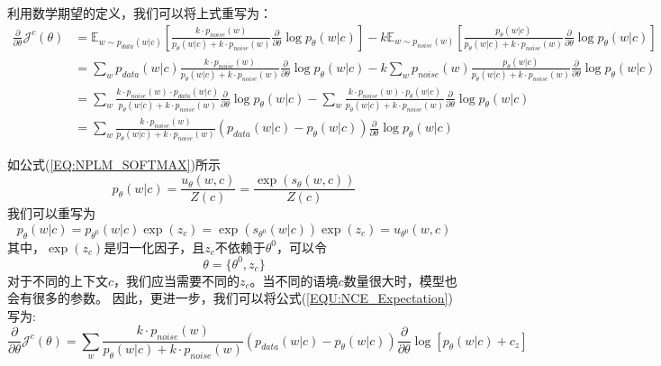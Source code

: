 \documentclass{article}
\begin{document}
利用数学期望的定义，我们可以将上式重写为：
\begin{equation}
    \begin{split}
        \frac{\partial}{\partial \theta} \mathcal{J}^c (\theta) &= \mathbb{E}_{w \sim p_{data}(w|c)} \left[ \frac{k \cdot p_{noise}(w)}{p_\theta(w|c) + k \cdot p_{noise}(w)}  \frac{\partial}{\partial \theta} \log p_\theta(w|c) \right] -  k  \mathbb{E}_{w \sim p_{noise}(w)} \left[ \frac{p_\theta(w|c)}{p_\theta (w|c) + k \cdot p_{noise}(w)} \frac{\partial}{\partial \theta} \log p_\theta(w|c) \right] \\
        &= \sum_w p_{data}(w|c) \frac{k \cdot p_{noise}(w)}{p_\theta(w|c) + k \cdot p_{noise}(w)}  \frac{\partial}{\partial \theta} \log p_\theta(w|c) - k \sum_w p_{noise}(w) \frac{p_\theta(w|c)}{p_\theta (w|c) + k \cdot p_{noise}(w)} \frac{\partial}{\partial \theta} \log p_\theta(w|c) \\
        &= \sum_w  \frac{k \cdot p_{noise}(w) \cdot p_{data}(w|c)}{p_\theta(w|c) + k \cdot p_{noise}(w)}  \frac{\partial}{\partial \theta} \log p_\theta(w|c) - \sum_w  \frac{k \cdot p_{noise}(w) \cdot p_\theta(w|c)}{p_\theta (w|c) + k \cdot p_{noise}(w)} \frac{\partial}{\partial \theta} \log p_\theta(w|c)\\
        &= \sum_w \frac{k \cdot p_{noise}(w)}{p_\theta(w|c) + k \cdot p_{noise}(w)} (p_{data}(w|c)-p_\theta(w|c)) \frac{\partial}{\partial \theta} \log p_\theta(w|c)
    \end{split}
    \label{EQU:NCE_Expectation}
\end{equation}

如公式(\ref{EQ:NPLM_SOFTMAX})所示
\begin{equation}
    p_{\theta}(w|c) = \frac{u_\theta(w, c)}{Z(c)} = \frac{\exp (s_\theta (w, c))}{Z(c)}
    \label{EQ:ExpAndZ}
\end{equation}
我们可以重写为
\begin{equation}
    p_\theta(w|c) = p_{\theta^0}(w|c)\exp (z_c) = \exp(s_{\theta^0}(w|c))\exp (z_c) = u_{\theta^0}(w,c)
    \label{EQ:Theta0}
\end{equation}
其中，$\exp(z_c)$是归一化因子，且$z_c$不依赖于$\theta^0$，可以令
\begin{equation}
    \theta = \{\theta^0, z_c\}
\end{equation}
对于不同的上下文$c$，我们应当需要不同的$z_c$。当不同的语境$c$数量很大时，模型也会有很多的参数。
因此，更进一步，我们可以将公式(\ref{EQU:NCE_Expectation})写为:
\begin{equation}
    \frac{\partial}{\partial \theta} \mathcal{J}^c (\theta) = \sum_w \frac{k \cdot p_{noise}(w)}{p_\theta(w|c) + k \cdot p_{noise}(w)} (p_{data}(w|c)-p_\theta(w|c)) \frac{\partial}{\partial \theta} \log \left[ p_\theta(w|c) + c_z  \right]
\end{equation}
\end{document}
